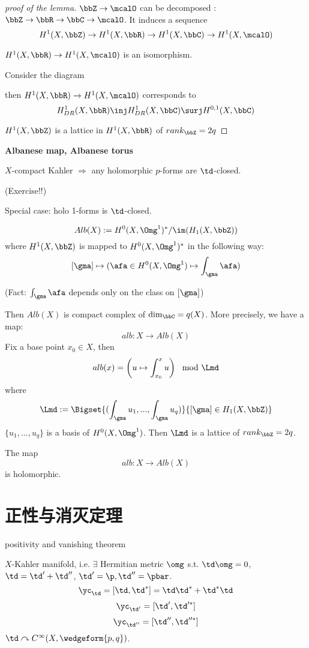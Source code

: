 \begin{proof}[proof of the lemma]

$\bbZ\to\mcalO$ can be decomposed : $\bbZ\to\bbR\to\bbC\to\mcalO$.
It induces a sequence
$$H^1(X,\bbZ)\to H^1(X,\bbR)\to H^1(X,\bbC)\to H^1(X,\mcalO)$$

$H^1(X,\bbR)\to H^1(X,\mcalO)$ is an isomorphism.

Consider the diagram

then $H^1(X,\bbR)\to H^1(X,\mcalO)$ corresponds to
$$
  H^1_{DR}(X,\bbR)\inj H^1_{DR}(X,\bbC)\surj H^{0,1}(X,\bbC)
$$

$H^1(X,\bbZ)$ is a lattice in $H^1(X,\bbR)$ of $rank_{\bbZ}=2q$
\end{proof}

\textbf{Albanese map, Albanese torus}

$X$-compact Kahler $\Rightarrow$ any holomorphic $p$-forms are $\td$-closed.

(Exercise!!)

Special case: holo 1-forms is $\td$-closed.

$$Alb(X):=H^0(X,\Omg^1)^*/\im(H_1(X,\bbZ))$$
where $H^1(X,\bbZ)$ is mapped to
$H^0(X,\Omg^1)^*$ in the following way:
$$[\gma]\mapsto(\afa\in H^0(X,\Omg^1)\mapsto\int_\gma\afa)$$

(Fact: $\int_\gma\afa$ depends only on the class on $[\gma]$)

Then $Alb(X)$ is compact complex of $\dim_\bbC=q(X)$.
More precisely, we have a map:
$$alb: X\to Alb(X)$$
Fix a base point $x_0\in X$, then
$$alb(x)=
\left(
  u\mapsto
  \int_{x_0}^x u
\right)\mod\Lmd
$$
where
$$\Lmd:=\Bigset{(\int_\gma u_1,...,\int_\gma u_q)}
{[\gma]\in H_1(X,\bbZ)}$$
$\{u_1,...,u_q\}$ is a basis of $H^0(X,\Omg^1)$.
Then $\Lmd$ is a lattice of $rank_\bbZ=2q$.

The map
$$alb: X\to Alb(X)$$
is holomorphic.



\section{正性与消灭定理}
positivity and vanishing theorem

$X$-Kahler manifold, i.e. $\exists$ Hermitian metric $\omg$ s.t. $\td\omg=0$,
$\td=\td'+\td''$, $\td'=\p,\td''=\pbar$.
$$\yc_\td=[\td,\td^*]=\td\td^*+\td^*\td$$
$$\yc_{\td'}=[\td',\td'^*]$$
$$\yc_{\td''}=[\td'',\td''^*]$$
$\td\curvearrowright C^{\infty}(X,\wedgeform{p,q})$.

